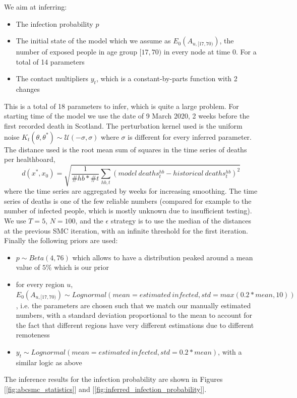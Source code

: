 \documentclass[11pt]{article}
\begin{document}
We aim at inferring:
\begin{itemize}
\item The infection probability $p$
\item The initial state of the model which we assume as $E_0(A_{u,[17, 70)})$, the number of exposed people in age group $[17,70)$ in every node at time 0. For a total of 14 parameters
\item The contact multipliers $y_t$, which is a constant-by-parts function with 2 changes
\end{itemize}

This is a total of 18 parameters to infer, which is quite a large problem. For starting time of the model we use the date of 9 March 2020, 2 weeks before the first recorded death in Scotland. The perturbation kernel used is the uniform noise $K_t(\theta, \theta^*) \sim \mathcal{U}(-\sigma, \sigma)$ where $\sigma$ is different for every inferred parameter. The distance used is the root mean sum of squares in the time series of deaths per healthboard, $$d(x^*, x_0)=\sqrt{\frac{1}{\#hb * \#t}\sum_{hb, t} (model \ deaths^{hb}_t - historical \ deaths^{hb}_t)^2}$$ where the time series are aggregated by weeks for increasing smoothing. The time series of deaths is one of the few reliable numbers (compared for example to the number of infected people, which is mostly unknown due to insufficient testing). We use $T=5$, $N=100$, and the $\epsilon$ strategy is to use the median of the distances at the previous SMC iteration, with an infinite threshold for the first iteration. Finally the following priors are used:

\begin{itemize}
\item $p \sim Beta(4, 76)$ which allows to have a distribution peaked around a mean value of $5\%$ which is our prior
\item for every region $u$, $E_0(A_{u,[17, 70)}) \sim Lognormal(mean=estimated \ infected, std=max(0.2 * mean, 10))$, i.e. the parameters are chosen such that we match our manually estimated numbers, with a standard deviation proportional to the mean to account for the fact that different regions have very different estimations due to different remoteness
\item $y_t \sim Lognormal(mean=estimated \ infected, std=0.2 * mean)$, with a similar logic as above
\end{itemize}

The inference results for the infection probability are shown in Figures [\ref{fig:abcsmc_statistics}] and [\ref{fig:inferred_infection_probability}].
\end{document}
